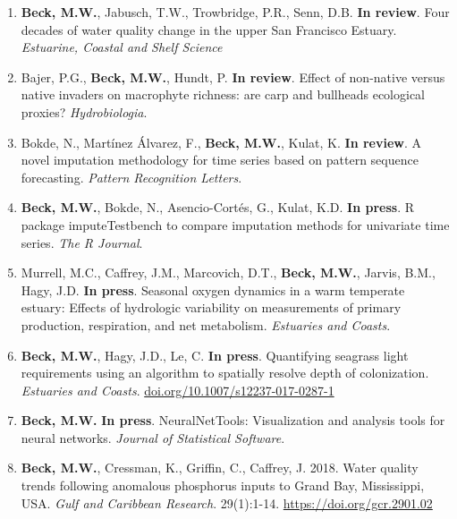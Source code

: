 \documentclass[letterpaper,12pt]{article}
\begin{document}
\begin{enumerate}

\item \textbf{Beck, M.W.}, Jabusch, T.W., Trowbridge, P.R., Senn, D.B. {\bf In review}. Four decades of water quality change in the upper San Francisco Estuary. \textit{Estuarine, Coastal and Shelf Science}

\item Bajer, P.G., \textbf{Beck, M.W.}, Hundt, P. {\bf In review}. Effect of non-native versus native invaders on macrophyte richness: are carp and bullheads ecological proxies? \textit{Hydrobiologia}. 

\item Bokde, N., Mart\'{i}nez \'{A}lvarez, F., \textbf{Beck, M.W.}, Kulat, K. {\bf In review}. A novel imputation methodology for time series based on pattern sequence forecasting. \textit{Pattern Recognition Letters}.

\item \textbf{Beck, M.W.}, Bokde, N., Asencio-Cort\'{e}s, G., Kulat, K.D. {\bf In press}. R package imputeTestbench to compare imputation methods for univariate time series. \textit{The R Journal}. 

\item Murrell, M.C., Caffrey, J.M., Marcovich, D.T., \textbf{Beck, M.W.}, Jarvis, B.M., Hagy, J.D. {\bf In press}. Seasonal oxygen dynamics in a warm temperate estuary: Effects of hydrologic variability on measurements of primary production, respiration, and net metabolism. \textit{Estuaries and Coasts}.

\item \textbf{Beck, M.W.}, Hagy, J.D., Le, C. {\bf In press}. Quantifying seagrass light requirements using an algorithm to spatially resolve depth of colonization. \textit{Estuaries and Coasts}. {\footnotesize\href{http://dx.doi.org/10.1007/s12237-017-0287-1}{doi.org/10.1007/s12237-017-0287-1}}

\item \textbf{Beck, M.W.} {\bf In press}. NeuralNetTools: Visualization and analysis tools for neural networks. \textit{Journal of Statistical Software}.

\item \textbf{Beck, M.W.}, Cressman, K., Griffin, C., Caffrey, J. 2018. Water quality trends following anomalous phosphorus inputs to Grand Bay, Mississippi, USA. \textit{Gulf and Caribbean Research}. 29(1):1-14. {\footnotesize\href{https://doi.org/gcr.2901.02}{https://doi.org/gcr.2901.02}}


\end{enumerate}
\end{document}

